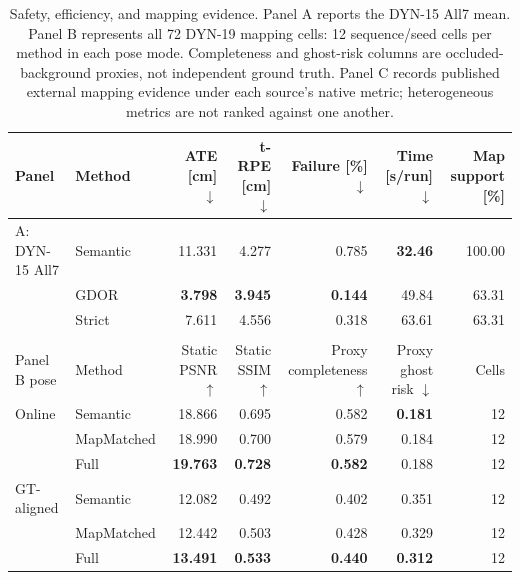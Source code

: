 \begin{table}[t]
\centering
\caption{Safety, efficiency, and mapping evidence. Panel A reports the DYN-15 All7 mean. Panel B represents all 72 DYN-19 mapping cells: 12 sequence/seed cells per method in each pose mode. Completeness and ghost-risk columns are occluded-background proxies, not independent ground truth. Panel C records published external mapping evidence under each source's native metric; heterogeneous metrics are not ranked against one another.}
\label{tab:safety-efficiency}
\footnotesize
\begin{tabular}{llrrrrr}
\toprule
Panel & Method & ATE [cm] $\downarrow$ & t-RPE [cm] $\downarrow$ & Failure [\%] $\downarrow$ & Time [s/run] $\downarrow$ & Map support [\%] \\
\midrule
A: DYN-15 All7 & Semantic & 11.331 & 4.277 & 0.785 & \textbf{32.46} & 100.00 \\
& GDOR & \textbf{3.798} & \textbf{3.945} & \textbf{0.144} & 49.84 & 63.31 \\
& Strict & 7.611 & 4.556 & 0.318 & 63.61 & 63.31 \\
\midrule
\multicolumn{7}{c}{}\\[-1.8ex]
\toprule
Panel B pose & Method & Static PSNR $\uparrow$ & Static SSIM $\uparrow$ & Proxy completeness $\uparrow$ & Proxy ghost risk $\downarrow$ & Cells \\
\midrule
Online & Semantic & 18.866 & 0.695 & 0.582 & \textbf{0.181} & 12 \\
& MapMatched & 18.990 & 0.700 & 0.579 & 0.184 & 12 \\
& Full & \textbf{19.763} & \textbf{0.728} & \textbf{0.582} & 0.188 & 12 \\
GT-aligned & Semantic & 12.082 & 0.492 & 0.402 & 0.351 & 12 \\
& MapMatched & 12.442 & 0.503 & 0.428 & 0.329 & 12 \\
& Full & \textbf{13.491} & \textbf{0.533} & \textbf{0.440} & \textbf{0.312} & 12 \\
\bottomrule
\end{tabular}


\end{table}
